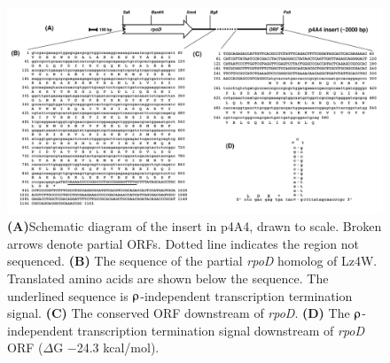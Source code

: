 \begin{figure}
\centering
\includegraphics{figures/chap3_4a4}
\caption[\emph{rpoD} homolog of Lz4W]{\textbf{(A)}Schematic
diagram of the insert in p4A4, drawn to  scale. Broken arrows
denote partial ORFs. Dotted line indicates the region not
sequenced. \textbf{(B)} The sequence of the partial \emph{rpoD}
homolog of Lz4W. Translated amino acids are shown below the
sequence. The underlined sequence is $\rhoup$-independent
transcription termination signal. \textbf{(C)} The conserved ORF
downstream of \emph{rpoD}. \textbf{(D)} The $\rhoup$-independent
transcription termination signal downstream of \emph{rpoD} ORF
($\Delta$G $-$24.3 kcal/mol).} \label{chap3:4a4}
\end{figure}

